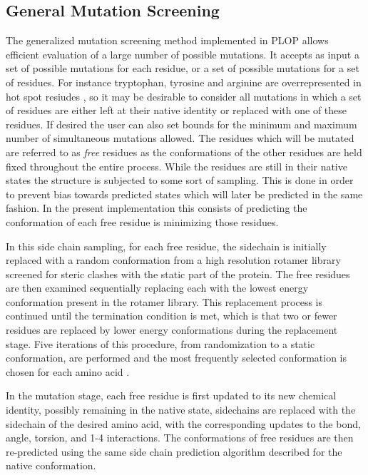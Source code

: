 \subsection{General Mutation Screening}
The generalized mutation screening method implemented in PLOP allows efficient evaluation of a large number of possible mutations.
It accepts as input a set of possible mutations for each residue, or a set of possible mutations for a set of residues.
For instance tryptophan, tyrosine and arginine are overrepresented in hot spot resiudes \cite{hu2000conservation}, so it may be desirable to consider all mutations in which a set of residues are either left at their native identity or replaced with one of these residues.
If desired the user can also set bounds for the minimum and maximum number of simultaneous mutations allowed.
The residues which will be mutated are referred to as {\it free} residues as the conformations of the other residues are held fixed throughout the entire process.
While the residues are still in their native states the structure is subjected to some sort of sampling.
This is done in order to prevent bias towards predicted states which will later be predicted in the same fashion.
In the present implementation this consists of predicting the conformation of each free residue is minimizing those residues.

In this side chain sampling, for each free residue, the sidechain is initially replaced with a random conformation from a high resolution rotamer library screened for steric clashes with the static part of the protein.
The free residues are then examined sequentially replacing each with the lowest energy conformation present in the rotamer library.
This replacement process is continued until the termination condition is met, which is that two or fewer residues are replaced by lower energy conformations during the replacement stage.
Five iterations of this procedure, from randomization to a static conformation, are performed and the most frequently selected conformation is chosen for each amino acid \cite{jacobson2002force,jacobson2002role}.

In the mutation stage, each free residue is first updated to its new chemical identity, possibly remaining in the native state, sidechains are replaced with the sidechain of the desired amino acid, with the corresponding updates to the bond, angle, torsion, and 1-4 interactions.
The conformations of free residues are then re-predicted using the same side chain prediction algorithm described for the native conformation.


